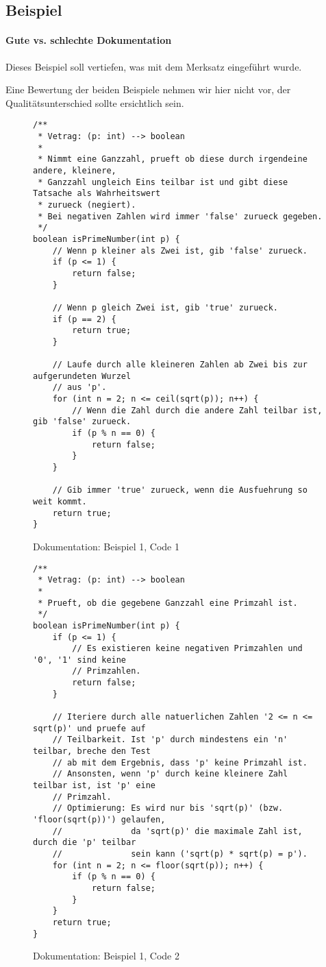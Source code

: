 \subsection{Beispiel}
	\paragraph{Gute vs. schlechte Dokumentation}
		Dieses Beispiel soll vertiefen, was mit dem Merksatz eingeführt wurde.
		
		Eine Bewertung der beiden Beispiele nehmen wir hier nicht vor, der Qualitätsunterschied sollte ersichtlich sein.
		
		\begin{figure}[H]
			\centering
			\begin{lstlisting}
/**
 * Vetrag: (p: int) --> boolean
 *
 * Nimmt eine Ganzzahl, prueft ob diese durch irgendeine andere, kleinere,
 * Ganzzahl ungleich Eins teilbar ist und gibt diese Tatsache als Wahrheitswert
 * zurueck (negiert).
 * Bei negativen Zahlen wird immer 'false' zurueck gegeben.
 */
boolean isPrimeNumber(int p) {
	// Wenn p kleiner als Zwei ist, gib 'false' zurueck.
	if (p <= 1) {
		return false;
	}

	// Wenn p gleich Zwei ist, gib 'true' zurueck.
	if (p == 2) {
		return true;
	}

	// Laufe durch alle kleineren Zahlen ab Zwei bis zur aufgerundeten Wurzel
	// aus 'p'.
	for (int n = 2; n <= ceil(sqrt(p)); n++) {
		// Wenn die Zahl durch die andere Zahl teilbar ist, gib 'false' zurueck.
		if (p % n == 0) {
			return false;
		}
	}

	// Gib immer 'true' zurueck, wenn die Ausfuehrung so weit kommt.
	return true;
}
			\end{lstlisting}
			\caption{Dokumentation: Beispiel 1, Code 1}
		\end{figure}

		\begin{figure}[H]
			\centering
			\begin{lstlisting}
/**
 * Vetrag: (p: int) --> boolean
 *
 * Prueft, ob die gegebene Ganzzahl eine Primzahl ist.
 */
boolean isPrimeNumber(int p) {
	if (p <= 1) {
		// Es existieren keine negativen Primzahlen und '0', '1' sind keine
		// Primzahlen.
		return false;
	}

	// Iteriere durch alle natuerlichen Zahlen '2 <= n <= sqrt(p)' und pruefe auf
	// Teilbarkeit. Ist 'p' durch mindestens ein 'n' teilbar, breche den Test
	// ab mit dem Ergebnis, dass 'p' keine Primzahl ist.
	// Ansonsten, wenn 'p' durch keine kleinere Zahl teilbar ist, ist 'p' eine
	// Primzahl.
	// Optimierung: Es wird nur bis 'sqrt(p)' (bzw. 'floor(sqrt(p))') gelaufen,
	//              da 'sqrt(p)' die maximale Zahl ist, durch die 'p' teilbar
	//              sein kann ('sqrt(p) * sqrt(p) = p').
	for (int n = 2; n <= floor(sqrt(p)); n++) {
		if (p % n == 0) {
			return false;
		}
	}
	return true;
}
			\end{lstlisting}
			\caption{Dokumentation: Beispiel 1, Code 2}
		\end{figure}
